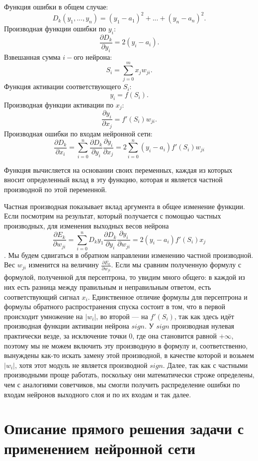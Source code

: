 \documentclass[14pt]{extreport}
\begin{document}
        Функция ошибки в общем случае:
            $$D_k(y_1,...,y_n)=(y_1-a_1)^2+...+(y_n-a_n)^2.$$
        Производная функции ошибки по $y_i$:
            $$\frac{\partial{D_k}}{\partial{y_i}}=2(y_i-a_i).$$
        Взвешанная сумма $i-$ого нейрона:
            $$S_i=\sum_{j=0}^{m}x_j w_{ji}.$$
        Функция активации соответствующего $S_i$:
            $$y_i=f(S_i).$$
        Производная функции активации по $x_j$:
            $$\frac{\partial{y_i}}{\partial{x_j}}={f'(S_i)w_{ji}}.$$
        Производная ошибки по входам нейронной сети:
            $$\frac{\partial{D_k}}{\partial {x_i}}=\sum_{i=0}^{n}\frac{\partial{D_k}}{\partial {y_i}}\frac{\partial{y_i}}{\partial {x_j}} = 2\sum_{i=0}^{n}(y_i-a_i)f'(S_i)w_{ji}$$

    Функция вычисляется на основании своих переменных, каждая из которых вносит определенный вклад в эту функцию, которая и является частной производной по этой переменной.
    
    Частная производная показывает вклад аргумента в общее изменение функции. Если посмотрим на результат, который получается с помощью частных производных, для изменения выходных весов нейрона \[\frac{\partial{E_k}}{\partial w_{ji}}=\sum_{i=0}^{n}{D_k}{y_1}\frac{\partial{D_k}}{\partial{y_i}}\frac{\partial{y_i}}{\partial {w_{ji}}} = 2(y_i-a_i)f'(S_i)x_j\]. Мы будем сдвигаться в обратном направлении изменению частной производной. Вес $w_{ji}$ изменится на величину $\frac{\partial{E_k}}{\partial w_{ji}}$. Если мы сравним полученную формулу с формулой, полученной для персептрона, то увидим много общего: в каждой из них есть разница между правильным и неправильным ответом, есть соответствующий сигнал $x_i$. Единственное отличие формулы для персептрона и формулы обратного распространения спуска состоит в том, что в первой происходит умножение на $|w_i|$, во второй --- на $f'(S_i)$, так как здесь идёт производная функции активации нейрона $sign$. У $sign$ производная нулевая практически везде, за исключение точки 0, где она становится равной $+ \infty$, поэтому мы не можем включить эту производную в формулу и, соответственно, вынуждены как-то искать замену этой производной, в качестве которой и возьмем  $|w_i|$, хотя этот модуль не является производной   $sign$. Далее, так как с частными производными проще работать, поскольку они математически строже определены, чем с аналогиями советчиков, мы смогли получить распределение ошибки по входам нейронов выходного слоя и по их входам и так далее.
\newpage
    \chapter{Описание прямого решения задачи с применением нейронной сети}
\end{document}
